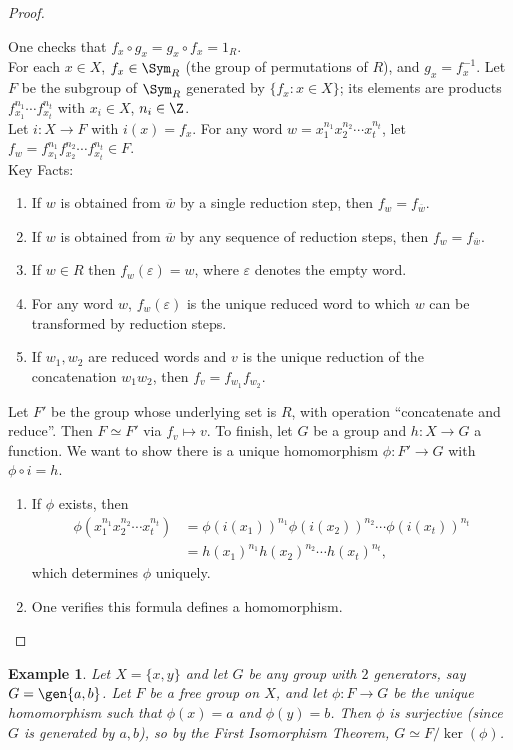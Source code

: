 \documentclass[a4paper,12pt]{article}
\newtheorem{eg}[thm]{Example}
\begin{document}
\begin{proof}
\begin{enumerate}
    \end{enumerate}
    One checks that $f_x \circ g_x = g_x \circ f_x = 1_R$. \\
    For each $x\in X$, $f_x\in \Sym_R$ (the group of permutations of $R$), and $g_x=f_x^{-1}$. Let $F$ be the subgroup of $\Sym_R$ generated by $\{f_x : x\in X\}$; its elements are products $f_{x_1}^{n_1}\cdots f_{x_t}^{n_t}$ with $x_i\in X$, $n_i\in \Z$. \\
    Let $i:X\to F$ with $i(x)=f_x$. For any word $w=x_1^{n_1}x_2^{n_2}\cdots x_t^{n_t}$, let $f_w=f_{x_1}^{n_1}f_{x_2}^{n_2}\cdots f_{x_t}^{n_t}\in F.$\\
    Key Facts:
    \begin{enumerate}
        \item If $w$ is obtained from $\overline{w}$ by a single reduction step, then $f_w=f_{\overline{w}}$.
        \item If $w$ is obtained from $\overline{w}$ by any sequence of reduction steps, then $f_w=f_{\overline{w}}$.
        \item If $w\in R$ then $f_w(\varepsilon)=w$, where $\varepsilon$ denotes the empty word.
        \item For any word $w$, $f_w(\varepsilon)$ is the unique reduced word to which $w$ can be transformed by reduction steps.
        \item If $w_1,w_2$ are reduced words and $v$ is the unique reduction of the concatenation $w_1w_2$, then $f_v=f_{w_1}f_{w_2}$.
    \end{enumerate}
    Let $F'$ be the group whose underlying set is $R$, with operation ``concatenate and reduce''. Then $F \simeq F'$ via $f_v \mapsto v$. To finish, let $G$ be a group and $h:X\to G$ a function. We want to show there is a unique homomorphism $\phi:F'\to G$ with $\phi \circ i = h$.
    \begin{enumerate}
        \item If $\phi$ exists, then
        \begin{align*}
            \phi(x_1^{n_1}x_2^{n_2}\cdots x_t^{n_t})&=\phi(i(x_1))^{n_1}\phi(i(x_2))^{n_2}\cdots \phi(i(x_t))^{n_t}\\
            &=h(x_1)^{n_1}h(x_2)^{n_2}\cdots h(x_t)^{n_t},
        \end{align*}
        which determines $\phi$ uniquely.
        \item One verifies this formula defines a homomorphism.
    \end{enumerate}  
\end{proof}
\begin{eg}
    Let $X=\{x,y\}$ and let $G$ be any group with $2$ generators, say $G=\gen{a,b}$. Let $F$ be a free group on $X$, and let $\phi: F\to G$ be the unique homomorphism such that $\phi(x)=a$ and $\phi(y)=b$. Then $\phi$ is surjective (since $G$ is generated by $a,b$), so by the First Isomorphism Theorem, $G \simeq F/\ker(\phi)$.
\end{eg}
\newpage
\end{document}
